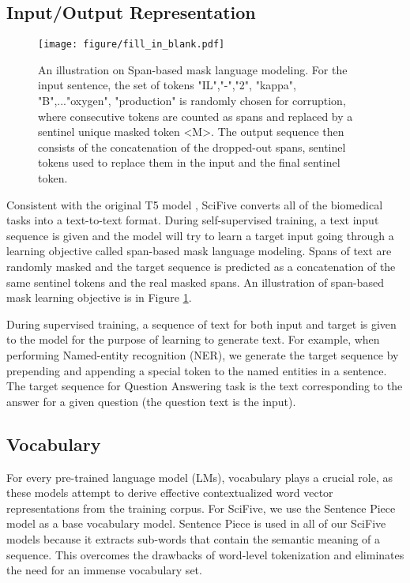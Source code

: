 \documentclass[nocrop]{bioinfo}
\begin{document}
\begin{methods}
\subsection{Input/Output Representation}
\begin{figure}[hbt!]
    \centering
    \texttt{[image: figure/fill\_in\_blank.pdf]}
    \caption{An illustration on Span-based mask language modeling. For the input sentence, the set of tokens "IL","-","2", "kappa", "B",..."oxygen", "production" is randomly chosen for corruption, where consecutive tokens are counted as spans and replaced by a sentinel unique masked token <M>. The output sequence then consists of the concatenation of the dropped-out spans, sentinel tokens used to replace them in the input and the final sentinel token. }
    \label{fig:learning_objective}
\end{figure}
Consistent with the original T5 model \cite{DBLP:journals/corr/abs-1910-10683}, SciFive converts all of the biomedical tasks into a text-to-text format. During self-supervised training, a text input sequence is given and the model will try to learn a target input going through a learning objective called span-based mask language modeling. Spans of text are randomly masked and the target sequence is predicted as a concatenation of the same sentinel tokens and the real masked spans. An illustration of span-based mask learning objective is in Figure \ref{fig:learning_objective}.

During supervised training, a sequence of text for both input and target is given to the model for the purpose of learning to generate text. For example, when performing Named-entity recognition (NER), we generate the target sequence by prepending and appending a special token to the named entities in a sentence. The target sequence for Question Answering task is the text corresponding to the answer for a given question (the question text is the input). 

\subsection{Vocabulary}
For every pre-trained language model (LMs), vocabulary plays a crucial role, as these models attempt to derive effective contextualized word vector representations from the training corpus. For SciFive, we use the Sentence Piece model \citep{DBLP:journals/corr/abs-1808-06226} as a base vocabulary model. Sentence Piece is used in all of our  SciFive models because it extracts sub-words that contain the semantic meaning of a sequence. This overcomes the drawbacks of word-level tokenization and eliminates the need for an immense vocabulary set. 


\end{methods}
\end{document}
